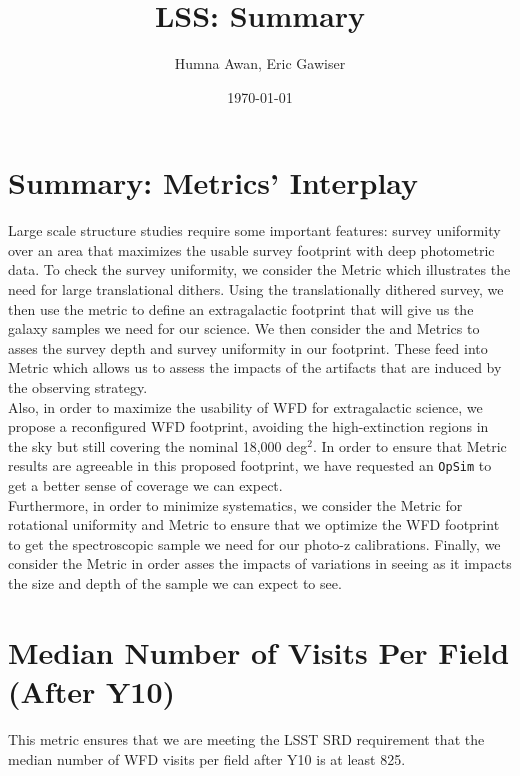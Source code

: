 \documentclass[a4paper,10pt]{article}
\title{LSS: Summary}
\author{Humna Awan, Eric Gawiser}
\date{\today}
\newcommand{\ttt}[1]{\texttt{#1}}
\begin{document}
\maketitle
\section*{Summary: Metrics' Interplay}

Large scale structure studies require some important features: survey uniformity over an area that maximizes the usable survey footprint with deep photometric data. To check the survey uniformity, we consider the  Metric which illustrates the need for large translational dithers. Using the translationally dithered survey, we then use the  metric to define an extragalactic footprint that will give us the galaxy samples we need for our science. We then consider the  and  Metrics to asses the survey depth and survey uniformity in our footprint. These feed into  Metric which allows us to assess the impacts of the artifacts that are induced by the observing strategy. \\

Also, in order to maximize the usability of WFD for extragalactic science, we propose a reconfigured WFD footprint, avoiding the high-extinction regions in the sky but still covering the nominal 18,000 deg$^2$. In order to ensure that  Metric results are agreeable in this proposed footprint, we have requested an \ttt{OpSim} to get a better sense of coverage we can expect. \\

Furthermore, in order to minimize systematics, we consider the  Metric for rotational uniformity and  Metric to ensure that we optimize the WFD footprint to get the spectroscopic sample we need for our photo-z calibrations. Finally, we consider the  Metric in order asses the impacts of variations in seeing as it impacts the size and depth of the sample we can expect to see.

\newpage
\section*{Median Number of Visits Per Field (After Y10)\label{median visits}}
This metric ensures that we are meeting the LSST SRD requirement that the median number of WFD visits per field after Y10 is at least 825.
\end{document}
